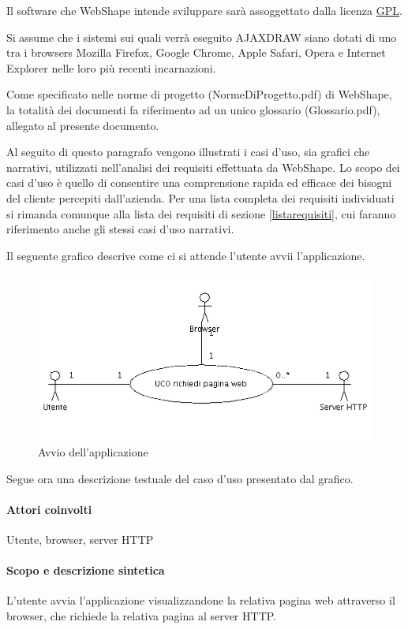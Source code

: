 Il software che WebShape intende sviluppare sar\`a assoggettato dalla licenza \underline{GPL}.

Si assume che i sistemi sui quali verr\`a eseguito AJAXDRAW siano dotati di uno tra i browsers Mozilla Firefox, Google Chrome, Apple Safari, Opera e Internet Explorer nelle loro pi\`u recenti incarnazioni.

Come specificato nelle norme di progetto (NormeDiProgetto.pdf) di WebShape, la totalit\` a dei documenti fa riferimento ad un unico glossario (Glossario.pdf), allegato al presente documento.

Al seguito di questo paragrafo vengono illustrati i casi d'uso, sia grafici che narrativi, utilizzati nell'analisi dei requisiti effettuata da WebShape. Lo scopo dei casi d'uso \`e quello di consentire una comprensione rapida ed efficace dei bisogni del cliente percepiti dall'azienda. Per una lista completa dei requisiti individuati si rimanda comunque alla lista dei requisiti di sezione \ref{listarequisiti}, cui faranno riferimento anche gli stessi casi d'uso narrativi.

Il seguente grafico descrive come ci si attende l'utente avvii l'applicazione.
\begin{figure}[!ht]
\centering
\includegraphics{UCAvvio.png}
\caption{Avvio dell'applicazione}
\end{figure}

Segue ora una descrizione testuale del caso d'uso presentato dal grafico.

\paragraph{Attori coinvolti} Utente, browser, server HTTP
\paragraph{Scopo e descrizione sintetica}
L'utente avvia l'applicazione visualizzandone la relativa pagina web attraverso il browser, che richiede la relativa pagina al server HTTP.
